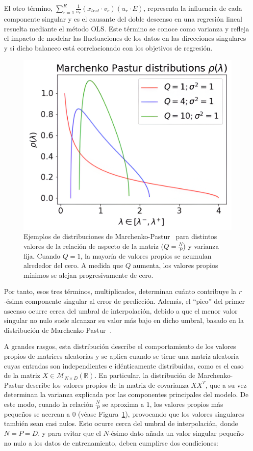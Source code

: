 El otro término, $\sum_{r=1}^{R}\frac{1}{\sigma_r}(x_{test} \cdot v_r)(u_r \cdot E)$, representa la influencia de cada componente singular y es el causante del doble descenso en una regresión lineal resuelta mediante el método OLS. Este término se conoce como varianza y refleja el impacto de modelar las fluctuaciones de los datos en las direcciones singulares y si dicho balanceo está correlacionado con los objetivos de regresión.\newline

\begin{figure}[h]
    \centering
    \includegraphics[width=0.5\linewidth]{img/marchenku-pastor.png}
    \caption[Ejemplos de distribuciones de Marchenko-Pastur~\cite{Charles2018}.]{Ejemplos de distribuciones de Marchenko-Pastur~\cite{Charles2018} para distintos valores de la relación de aspecto de la matriz ($Q = \frac{N}{P}$) y varianza fija. Cuando $Q = 1$, la mayoría de valores propios se acumulan alrededor del cero. A medida que $Q$ aumenta, los valores propios mínimos se alejan progresivamente de cero.}\label{fig:marchenkopastur}
\end{figure}

Por tanto, esos tres términos, multiplicados, determinan cuánto contribuye la $r$-ésima componente singular al error de predicción. Además, el ``pico'' del primer ascenso ocurre cerca del umbral de interpolación, debido a que el menor valor singular no nulo suele alcanzar su valor más bajo en dicho umbral, basado en la distribución de Marchenko-Pastur~\cite{Marchenko1967}.\newline

A grandes rasgos, esta distribución describe el comportamiento de los valores propios de matrices aleatorias y se aplica cuando se tiene una matriz aleatoria cuyas entradas son independientes e idénticamente distribuidas, como es el caso de la matriz $X \in \mathcal{M}_{N \times D}(\mathbb{R})$. En particular, la distribución de Marchenko-Pastur describe los valores propios de la matriz de covarianza $XX^{T}$, que a su vez determinan la varianza explicada por las componentes principales del modelo. De este modo, cuando la relación $\frac{N}{P}$ se aproxima a $1$, los valores propios más pequeños se acercan a $0$ (véase Figura~\ref{fig:marchenkopastur}), provocando que los valores singulares también sean casi nulos. Esto ocurre cerca del umbral de interpolación, donde $N = P = D$, y para evitar que el $N$-ésimo dato añada un valor singular pequeño no nulo a los datos de entrenamiento, deben cumplirse dos condiciones: 

